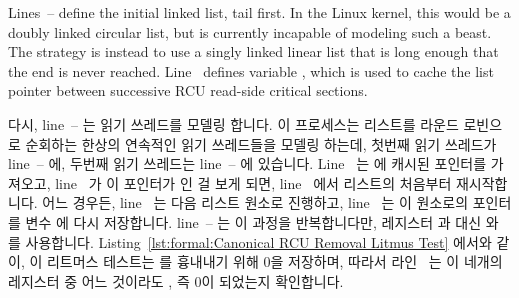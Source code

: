 \begin{lineref}
Lines~-- define the initial linked
list, tail first.
In the Linux kernel, this would be a doubly linked circular list,
but  is currently incapable of modeling such a beast.
The strategy is instead to use a singly linked linear list that
is long enough that the end is never reached.
Line~ defines variable , which is used to
cache the list pointer between successive RCU read-side critical
sections.
\fi

다시, line~-- 는 읽기 쓰레드를 모델링 합니다.
이 프로세스는 리스트를 라운드 로빈으로 순회하는 한상의 연속적인 읽기 쓰레드들을
모델링 하는데, 첫번째 읽기 쓰레드가 line~-- 에, 두번째
읽기 쓰레드는 line~-- 에 있습니다.
Line~ 는  에 캐시된 포인터를 가져오고,
line~ 가 이 포인터가  인 걸 보게 되면,
line~ 에서 리스트의 처음부터 재시작합니다.
어느 경우든, line~ 는 다음 리스트 원소로 진행하고,
line~ 는 이 원소로의 포인터를 변수  에 다시 저장합니다.
line~-- 는 이 과정을 반복합니다만, 레지스터  과
 대신  와  를 사용합니다.
Listing~\ref{lst:formal:Canonical RCU Removal Litmus Test} 에서와 같이, 이
리트머스 테스트는  를 흉내내기 위해 0을 저장하며, 따라서
라인~ 는 이 네개의 레지스터 중 어느 것이라도 , 즉 0이
되었는지 확인합니다.
\iffalse

Again, \co{P0()} on lines~\lnref{P0start}--\lnref{P0end} models readers.
This process models a pair of successive readers traversing round-robin
through the list, with the first reader on lines~\lnref{rl1}--\lnref{rul1}
and the second reader on lines~\lnref{rl2}--\lnref{rul2}.
Line~\lnref{rdcache} fetches the pointer cached in \co{c}, and if
line~\lnref{rdckcache} sees that the pointer was \co{NULL},
line~\lnref{rdinitcache} restarts at the beginning of the list.
In either case, line~\lnref{rdnext} advances to the next list element,
and line~\lnref{rdupdcache} stores a pointer to this element back into
variable \co{c}.
Lines~\lnref{rl2}--\lnref{rul2} repeat this process, but using
registers \co{r3} and \co{r4} instead of \co{r1} and \co{r2}.
As with
Listing~\ref{lst:formal:Canonical RCU Removal Litmus Test},
this litmus test stores zero to emulate \co{free()}, so
line~\lnref{exists_} checks for any of these four registers being
\co{NULL}, also known as zero.
\fi


\end{lineref}

